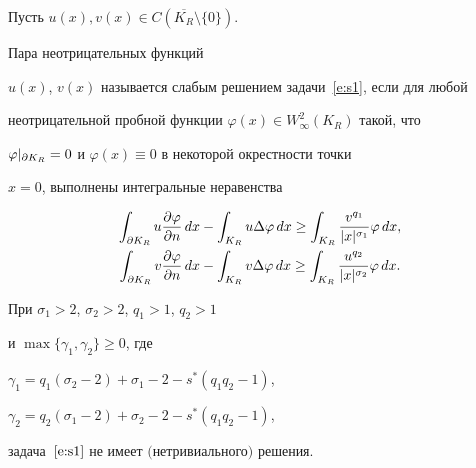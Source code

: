 \begin{defn}\label{dfn:s1}


Пусть $u(x), v(x)\in C(\overline{K_R}\setminus\{0\})$. 


Пара неотрицательных функций


$u(x)$, $v(x)$ называется слабым решением задачи~\eqref{e:s1}, если для любой


неотрицательной пробной функции $\varphi(x)\in W^2_\infty(K_R)$ такой, что


$\varphi|_{\partial K_R}=0$ и $\varphi(x)\equiv0$ в некоторой окрестности точки


$x=0$, выполнены интегральные неравенства


\begin{gather*}


\int_{\p K_R}u\frac{\p\varphi}{\p n}\,dx-\int_{K_R}u\Delta\varphi\,dx


\ge\int_{K_R}\frac{v^{q_1}}{|x|^{\sigma_1}}\varphi\,dx,\\


\int_{\p K_R}v\frac{\p\varphi}{\p n}\,dx-\int_{K_R}v\Delta\varphi\,dx


\ge\int_{K_R}\frac{u^{q_2}}{|x|^{\sigma_2}}\varphi\,dx.


\end{gather*}


\end{defn}





\begin{thm}\label{thm:s1} При $\sigma_1>2$, $\sigma_2>2$, $q_1>1$, $q_2>1$


и $\max\{\gamma_1,\gamma_2\}\ge0$, где


$\gamma_1=q_1(\sigma_2-2)+\sigma_1-2-s^*(q_1q_2-1)$,


$\gamma_2=q_2(\sigma_1-2)+\sigma_2-2-s^*(q_1q_2-1)$,


задача~$\eqref{e:s1}$ не имеет $($нетривиального$)$ решения.


\end{thm}





